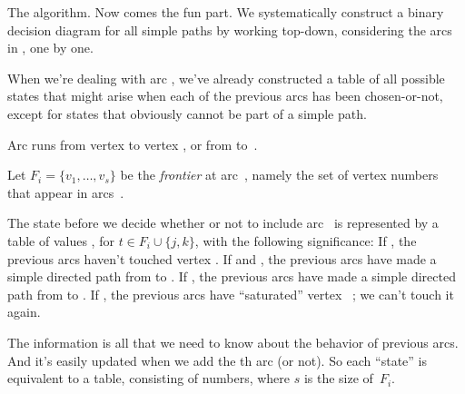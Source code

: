 The algorithm.
Now comes the fun part. We systematically construct a binary decision
diagram for all simple paths by working top-down, considering the
arcs in , one by one.

When we're dealing with arc , we've already constructed a table of
all possible states that might arise when each of the previous arcs has
been chosen-or-not, except for states that obviously cannot be
part of a simple path.

Arc  runs from vertex  to vertex ,
or from  to~.

Let $F_i=\{v_1,\ldots,v_s\}$ be the {\it frontier\/} at arc~,
namely the set of vertex numbers  that appear in arcs~.

The state before we decide whether or not to include arc~ is
represented by a table of values , for $t\in F_i\cup\{j,k\}$,
with the following significance:
If , the previous arcs haven't touched vertex .
If  and , the previous arcs have made a
simple directed
path from  to .
If , the previous arcs have made a simple directed
path from  to .
If , the previous arcs have ``saturated'' vertex~%
; we can't
touch it again.

The  information is all that we need to know about the behavior of
previous arcs. And it's easily updated when we add the th arc (or not).
So each ``state'' is equivalent to a  table, consisting of
 numbers, where $s$ is the size of~$F_i$.

